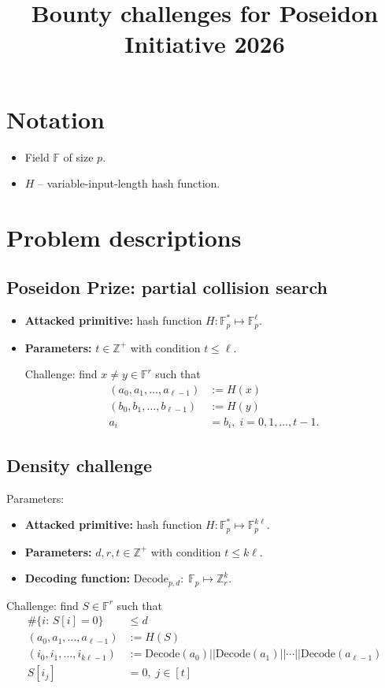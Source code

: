 \documentclass{article}
\title{Bounty challenges for Poseidon Initiative 2026}
\begin{document}
\maketitle
\section{Notation}
\begin{itemize}
    \item Field $\mathbb{F}$ of size $p$.
    \item $H$ -- variable-input-length hash function.
\end{itemize}

\section{Problem descriptions}

\subsection{{Poseidon Prize}: partial collision search}

\begin{itemize}
    \item
\textbf{Attacked primitive:} hash function $H:\mathbb{F}_p^{*}\mapsto \mathbb{F}_p^{\ell}$.
\item
\textbf{Parameters:} $ t\in\mathbb{Z}^{+}$ with condition $t\leq \ell$.

Challenge: find $x\neq y\in\mathbb{F}^r$ such that
\begin{align}
(a_0,a_1,\ldots,a_{\ell-1}) &:=H(x) \\
(b_0,b_1,\ldots,b_{\ell-1}) &:=H(y) \\
a_i &= b_i ,\; i=0,1,\ldots,t-1.
\end{align}

\end{itemize}

\subsection{Density challenge}
Parameters:
\begin{itemize}
    \item
\textbf{Attacked primitive:} hash function $H:\mathbb{F}_p^{*}\mapsto \mathbb{F}_p^{k\ell}$.
\item
\textbf{Parameters:} $d,r,t\in\mathbb{Z}^{+}$ with condition $t\leq k\ell$.

\item \textbf{Decoding function:} $\mathrm{Decode}_{p,d}:\;\mathbb{F}_p\mapsto \mathbb{Z}_r^k$.
\end{itemize}
Challenge: find $S\in\mathbb{F}^r$ such that
\begin{align}
\#\{i:\,S[i]=0\}&\leq d\\
(a_0,a_1,\ldots,a_{\ell-1}) &:=H(S) \\
(i_0,i_1,\ldots,i_{k\ell-1})&:=\mathrm{Decode}(a_0)||\mathrm{Decode}(a_1)||\cdots||\mathrm{Decode}(a_{\ell-1})\\
S[i_j]&=0,\; j\in[t]
\end{align}
\end{document}
